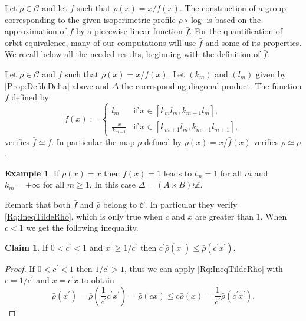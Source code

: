 \documentclass[english, 11pt, a4paper]{article}
\theoremstyle{definition}
\newtheorem{Ex}[Def]{Example}
\newtheorem{Claim}[Def]{Claim}
\numberwithin{equation}{section}
\newcommand{\bZ}{\mathbb{Z}}
\newcommand{\calC}{\mathcal{C}}
\newcommand{\BZ}{\Delta}
\newcommand{\rhoaff}{\bar{\rho}}
\begin{document}
Let $\rho \in \calC$ and let $f$ such that $\rho(x)=x/f(x)$. The construction of
a group corresponding to the given isoperimetric profile $\rho \circ \log$ is
based on the approximation of $f$ by a piecewise linear function $\bar{f}$.
For the quantification of orbit equivalence, many of our computations will use
$\bar{f}$ and some of its properties. We recall below all the
needed results, beginning with the definition of $\bar{f}$.

\begin{Lmm}
  \label{Prop:B2} Let $\rho\in \calC$ and $f$ such that $\rho(x)=x/f(x)$.
  Let $(k_m)$ and $(l_m)$ given by \cref{Prop:DefdeDelta} above and $\BZ$ the
  corresponding diagonal product. The function
  $\bar{f}$ defined by 
  \begin{equation}\label{Def:Tilde}
    \bar{f}(x):= \begin{cases}
      l_m & \text{if} \ x\in [k_ml_m,k_{m+1}l_m],\\
      \frac{x}{k_{m+1}} & \text{if} \ x\in [k_{m+1}l_m,k_{m+1}l_{m+1}],
    \end{cases}
  \end{equation}
  verifies $\bar{f} \simeq f$. In particular the map $\rhoaff$ defined by
  $\rhoaff(x)= x/\bar{f}(x)$ verifies $\rhoaff\simeq \rho$. 
\end{Lmm}
\begin{Ex}
  If $\rho(x)=x$ then $f(x)=1$ leads to $l_m=1$ for all $m$ and
  $k_m=+\infty$ for all $m\geq 1$. In this case $\BZ=(A\times B)\wr \bZ$.  
\end{Ex}


Remark that both $\bar{f}$ and $\rhoaff$ belong to $\calC$. In particular
they verify \cref{Rq:IneqTildeRho}, which is only true when $c$ and
$x$ are greater than $1$. When $c<1$ we get the following inequality.

\begin{Claim}\label{Claim:IneqTildeRho}
 If $0< c^\prime <1$ and $x^\prime \geq 1/c^\prime$ then $c^\prime\rhoaff(x^\prime)
 \leq\rhoaff(c^\prime x^\prime )$. 
\end{Claim}
\begin{proof}
  If $0< c^\prime <1$ then $1/c^\prime >1$, thus we can apply \cref{Rq:IneqTildeRho}
  with $c=1/c^\prime$ and $x=c^\prime x$ to obtain
 \begin{equation*} 
  \rhoaff(x^\prime) =\rhoaff\left(\frac{1}{c^\prime} c^\prime x^\prime\right)
      =\rhoaff(cx) \leq c\rhoaff(x)
    = \frac{1}{c^\prime}\rhoaff(c^\prime x^\prime).
  \end{equation*}
\end{proof}
\end{document}

